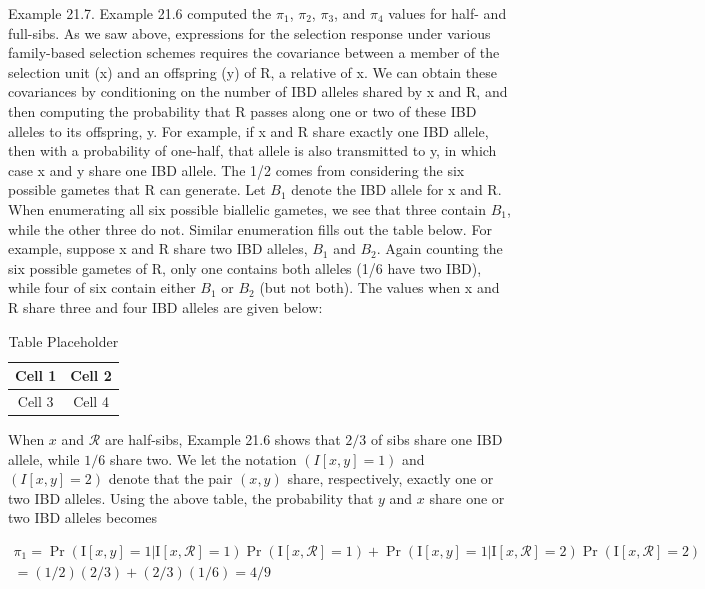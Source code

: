 \documentclass{article}
\begin{document}
Example 21.7. Example 21.6 computed the  $ \pi_1 $,  $ \pi_2 $,  $ \pi_3 $, and  $ \pi_4 $ values for half- and full-sibs. As we saw above, expressions for the selection response under various family-based selection schemes requires the covariance between a member of the selection unit (x) and an offspring (y) of R, a relative of x. We can obtain these covariances by conditioning on the number of IBD alleles shared by x and R, and then computing the probability that R passes along one or two of these IBD alleles to its offspring, y. For example, if x and R share exactly one IBD allele, then with a probability of one-half, that allele is also transmitted to y, in which case x and y share one IBD allele. The 1/2 comes from considering the six possible gametes that R can generate. Let  $ B_1 $ denote the IBD allele for x and R. When enumerating all six possible biallelic gametes, we see that three contain  $ B_1 $, while the other three do not. Similar enumeration fills out the table below. For example, suppose x and R share two IBD alleles,  $ B_1 $ and  $ B_2 $. Again counting the six possible gametes of R, only one contains both alleles (1/6 have two IBD), while four of six contain either  $ B_1 $ or  $ B_2 $ (but not both). The values when x and R share three and four IBD alleles are given below:

\begin{table}[h]
\centering
\begin{tabular}{|c|c|}
\hline
Cell 1 & Cell 2 \\
\hline
Cell 3 & Cell 4 \\
\hline
\end{tabular}
\caption{Table Placeholder}
\end{table}

When $x$ and $\mathcal{R}$ are half-sibs, Example 21.6 shows that $2/3$ of sibs share one IBD allele, while $1/6$ share two. We let the notation $(I[x,y]=1)$ and $(I[x,y]=2)$ denote that the pair $(x,y)$ share, respectively, exactly one or two IBD alleles. Using the above table, the probability that $y$ and $x$ share one or two IBD alleles becomes

\begin{equation}
\begin{aligned}\pi_{1}=\Pr(\mathrm{I}[x,y]=1|\mathrm{I}[x,\mathcal{R}]=1)\Pr(\mathrm{I}[x,\mathcal{R}]=1)+\Pr(\mathrm{I}[x,y]=1|\mathrm{I}[x,\mathcal{R}]=2)\Pr(\mathrm{I}[x,\mathcal{R}]=2)\\=(1/2)(2/3)+(2/3)(1/6)=4/9\end{aligned}
\end{equation}
\end{document}
